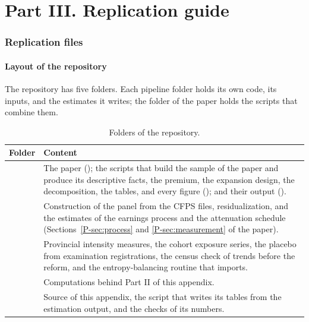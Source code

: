 \part*{Part III. Replication guide}

\section{Replication files}
\label{oa:replication}

\subsection{Layout of the repository}

The repository has five folders. Each pipeline folder holds its own
code, its inputs, and the estimates it writes; the folder of the paper
holds the scripts that combine them.

\begin{table}[H]
\centering
\small
\caption{Folders of the repository.}
\label{oatab:layout}
\begin{tabular}{@{}L{4.4cm}L{10.6cm}@{}}
\toprule
Folder & Content \\
\midrule
{} & The paper (); the scripts that build the sample of the paper and produce its descriptive facts, the premium, the expansion design, the decomposition, the tables, and every figure (); and their output (). \\
 & Construction of the panel from the CFPS
files, residualization, and the estimates of the earnings process and the
attenuation schedule
(Sections~\ref{P-sec:process} and \ref{P-sec:measurement} of the paper). \\
 & Provincial intensity measures, the cohort exposure series, the placebo from examination registrations, the census check of trends before the reform, and the entropy-balancing routine that  imports. \\
 & Computations behind Part II of this appendix. \\
 & Source of this appendix, the script that
writes its tables from the estimation output, and the checks of its
numbers. \\
\bottomrule
\end{tabular}
\end{table}

